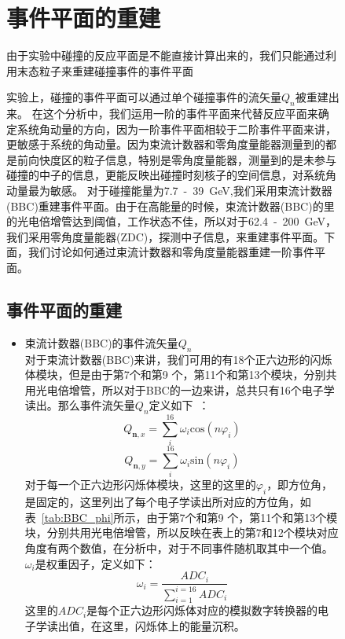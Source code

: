 \begin{figure}[htbp]
\section{事件平面的重建}

由于实验中碰撞的反应平面是不能直接计算出来的，我们只能通过利用末态粒子来重建碰撞事件的事件平面

实验上，碰撞的事件平面可以通过单个碰撞事件的流矢量$Q_{n}$被重建出来。
在这个分析中，我们运用一阶的事件平面来代替反应平面来确定系统角动量的方向，因为一阶事件平面相较于二阶事件平面来讲，更敏感于系统的角动量。因为束流计数器和零角度量能器测量到的都是前向快度区的粒子信息，特别是零角度量能器，测量到的是未参与碰撞的中子的信息，更能反映出碰撞时刻核子的空间信息，对系统角动量最为敏感。
对于碰撞能量为7.7~-~39~GeV,我们采用束流计数器(BBC)重建事件平面。由于在高能量的时候，束流计数器(BBC)的里的光电倍增管达到阈值，工作状态不佳，所以对于62.4~-~200~GeV，我们采用零角度量能器(ZDC)，探测中子信息，来重建事件平面。下面，我们讨论如何通过束流计数器和零角度量能器重建一阶事件平面。

\subsection{事件平面的重建}
\begin{itemize}
\item 束流计数器(BBC)的事件流矢量$Q_{n}$ \\
对于束流计数器(BBC)来讲，我们可用的有18个正六边形的闪烁体模块，但是由于第7个和第9 个，第11个和第13个模块，分别共用光电倍增管，所以对于BBC的一边来讲，总共只有16个电子学读出。那么事件流矢量$Q_{n}$定义如下~\cite{Poskanzer:1998yz,Voloshin:2008dg}：
\begin{equation}
\label{eq:BBC_Qn_x}
Q_{\textbf{n},x} = \sum_{i}^{16}\omega_{i}\mathrm{cos}(n\varphi_{i})
\end{equation}
\begin{equation}
\label{eq:BBC_Qn_y}
Q_{\textbf{n},y} = \sum_{i}^{16}\omega_{i}\mathrm{sin}(n\varphi_{i})
\end{equation}
对于每一个正六边形闪烁体模块，这里的这里的$\varphi_{i}$，即方位角，是固定的，这里列出了每个电子学读出所对应的方位角，如表~\ref{tab:BBC_phi}所示，由于第7个和第9 个，第11个和第13个模块，分别共用光电倍增管，所以反映在表上的第7和12个模块对应角度有两个数值，在分析中，对于不同事件随机取其中一个值。$\omega_{i}$是权重因子，定义如下：
\begin{equation}
\label{eq:BBC_weight}
\omega_{i} = \frac{ADC_{i}}{\sum_{i=1}^{i=16}ADC_{i}}
\end{equation}
这里的$ADC_{i}$是每个正六边形闪烁体对应的模拟数字转换器的电子学读出值，在这里，闪烁体上的能量沉积。


\end{itemize}
\end{figure}
